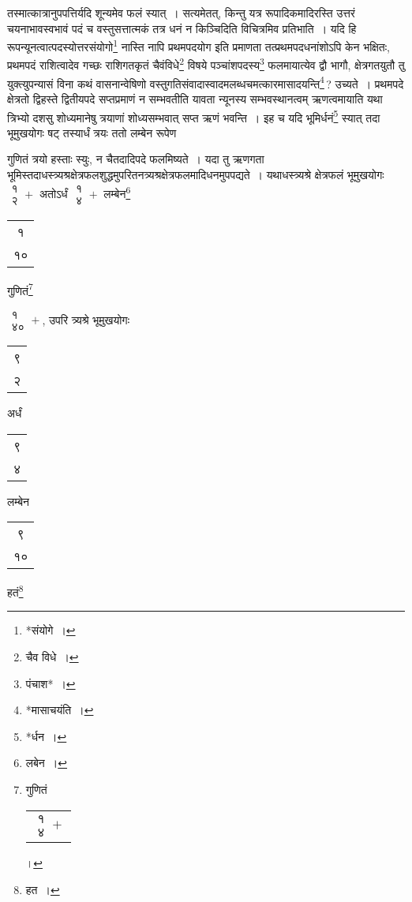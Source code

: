 \documentclass[10pt, openany]{book}
\begin{document}
{{{{तस्मात्कात्रानुपपत्तिर्यदि शून्यमेव फलं स्यात्~। सत्यमेतत्, किन्तु
यत्र रूपादिकमादिरस्ति उत्तरं चयनाभावस्वभावं पदं च वस्तुसत्तात्मकं तत्र धनं न
किञ्चिदिति}
{विचित्रमिव प्रतिभाति~। यदि हि रूपन्यूनत्वात्पदस्योत्तरसंयोगो\renewcommand{\thefootnote}{३}\footnote{*संयोगे~।} 
नास्ति नापि प्रथमपदयोग}
{इति प्रमाणता तत्प्रथमपदधनांशोऽपि केन भक्षितः, प्रथमपदं राशित्वादेव
गच्छः}
{राशिगतकृतं चैवंविधे\renewcommand{\thefootnote}{४}\footnote{चैव विधे~।} विषये पञ्चांशपदस्य\renewcommand{\thefootnote}{५}\footnote{पंचाश*~।} फलमायात्येव द्वौ भागौ,
क्षेत्रगतयुतौ तु}
{युक्त्युपन्यासं विना कथं वासनान्वेषिणो
वस्तुगतिसंवादास्वादमलब्धचमत्कारमासादयन्ति\renewcommand{\thefootnote}{६}\footnote{*मासाचयंति~।}\,?}
{उच्यते~। प्रथमपदे क्षेत्रतो द्विहस्ते द्वितीयपदे सप्तप्रमाणं न
सम्भवतीति यावता न्यूनस्य सम्भवस्थानत्वम् ऋणत्वमायाति यथा त्रिभ्यो दशसु शोध्यमानेषु त्रयाणां
शोध्यसम्भवात् सप्त ऋणं}
{भवन्ति~। इह च यदि भूमिर्धनं\renewcommand{\thefootnote}{७}\footnote{*र्धन~।}  स्यात् तदा भूमुखयोगः षट् तस्यार्धं
त्रयः ततो लम्बेन रूपेण}
{गुणितं त्रयो हस्ताः स्युः, न चैतदादिपदे फलमिष्यते~। यदा तु ऋणगता
भूमिस्तदाधस्त्र्यश्रक्षेत्रफलशुद्धमुपरितनत्र्यश्रक्षेत्रफलमादिधनमुपपद्यते~। यथाधस्त्र्यश्रे
क्षेत्रफलं भूमुखयोगः $\begin{matrix}
\mbox{{१}}\\
\mbox{{२}}
\end{matrix}+$ अतोऽर्धं $\begin{matrix}
\mbox{{१}}\\
\mbox{{४}}
\end{matrix}+$ लम्बेन\renewcommand{\thefootnote}{८}\footnote{लबेन~।}\begin{tabular}{c}१\\ १०\end{tabular}गुणितं\renewcommand{\thefootnote}{९}\footnote{गुणितं\begin{tabular}{c}$\begin{matrix}
\mbox{{१}}\\
\mbox{{४}}
\end{matrix}+$\end{tabular}।}} $\begin{matrix}
\mbox{{१}}\\
\mbox{{४०}}
\end{matrix}+$, उपरि त्र्यश्रे
भूमुखयोगः \begin{tabular}{|c|}९\\ २\\\hline \end{tabular} अर्धं \begin{tabular}{|c|}९\\ ४\\\hline \end{tabular} लम्बेन\begin{tabular}{c}९\\ १०\end{tabular}हतं\renewcommand{\thefootnote}{१०}\footnote{हत~।}
}}}
\end{document}
